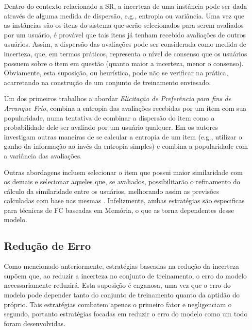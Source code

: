 Dentro do contexto relacionado a SR, a incerteza de uma instância pode ser dada através de alguma medida de dispersão, e.g., entropia ou variância. Uma vez que as instâncias são os itens do sistema que serão selecionados para serem avaliados por um usuário, é provável que tais itens já tenham recebido avaliações de outros usuários. Assim, a dispersão das avaliações pode ser considerada como medida de incerteza, que, em termos práticos, representa o nível de consenso que os usuários possuem sobre o item em questão (quanto maior a incerteza, menor o consenso). Obviamente, esta suposição, ou heurística, pode não se verificar na prática, acarretando na construção de um conjunto de treinamento enviesado.

Um dos primeiros trabalhos a abordar \textit{Elicitação de Preferência para fins de Arranque Frio}, \citep{Rashid:2002:GKY:502716.502737} combina a entropia das avaliações recebidas por um item com sua popularidade, numa tentativa de combinar a dispersão do item como a probabilidade dele ser avaliado por um usuário qualquer. Em \citep{Rashid:2008:LPN:1540276.1540302} os autores investigam outras maneiras de se calcular a entropia de um item (e.g., utilizar o ganho da informação ao invés da entropia simples) e \citep{Golbandi:2010:BRS:1871437.1871734} combina a popularidade com a variância das avaliações.

Outras abordagens incluem selecionar o item que possui maior similaridade com os demais \citep{Rashid:2006:MPD:1124772.1124915} e selecionar aqueles que, se avaliados, possibilitarão o refinamento do cálculo da similaridade entre os usuários, melhorando assim as previsões calculadas com base nas mesmas \citep{Mello:2010:ALD:1864708.1864782}. Infelizmente, ambas estratégias são especificas para técnicas de FC baseadas em Memória, o que as torna dependentes desse modelo.

\subsection{Redução de Erro}
Como mencionado anteriormente, estratégias baseadas na redução da incerteza supõem que, ao reduzir a incerteza no conjunto de treinamento, o erro do modelo necessariamente reduzirá. Esta suposição é enganosa, uma vez que o erro do modelo pode depender tanto do conjunto de treinamento quanto da aptidão do próprio. Tais estratégias combatem apenas o primeiro fator e negligenciam o segundo, portanto estratégias focadas em reduzir o erro do modelo como um todo foram desenvolvidas.

